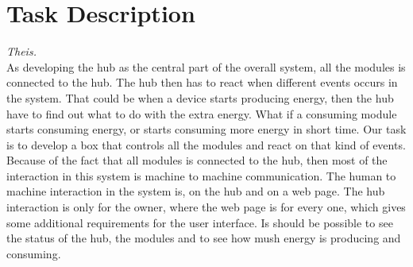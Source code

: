 \section{Task Description}\textit{Theis.}\\
As developing the hub as the central part of the overall system, all the modules is connected to the hub. The hub then has to react when different events occurs in the system. That could be when a device starts producing energy, then the hub have to find out what to do with the extra energy. What if a consuming module starts consuming energy, or starts consuming more energy in short time. Our task is to develop a box that controls all the modules and react on that kind of events. Because of the fact that all modules is connected to the hub, then most of the interaction in this system is machine to machine communication. The human to machine interaction in the system is, on the hub and on a web page. The hub interaction is only for the owner, where the web page is for every one, which gives some additional requirements for the user interface. Is should be possible to see the status of the hub, the modules and to see how mush energy is producing and consuming.